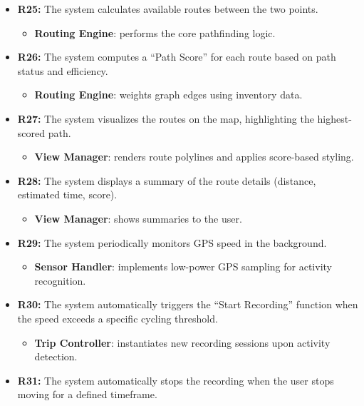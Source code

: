 \begin{itemize}
\begin{itemize}
          \end{itemize}
    \item \textbf{R25:} The system calculates available routes between the two points.
          \begin{itemize}
              \item \textbf{Routing Engine}: performs the core pathfinding logic.
          \end{itemize}
    \item \textbf{R26:} The system computes a “Path Score” for each route based on path status and efficiency.
          \begin{itemize}
              \item \textbf{Routing Engine}: weights graph edges using inventory data.
          \end{itemize}
    \item \textbf{R27:} The system visualizes the routes on the map, highlighting the highest-scored path.
          \begin{itemize}
              \item \textbf{View Manager}: renders route polylines and applies score-based styling.
          \end{itemize}
    \item \textbf{R28:} The system displays a summary of the route details (distance, estimated time, score).
          \begin{itemize}
              \item \textbf{View Manager}: shows summaries to the user.
          \end{itemize}
    \item \textbf{R29:} The system periodically monitors GPS speed in the background.
          \begin{itemize}
              \item \textbf{Sensor Handler}: implements low-power GPS sampling for activity recognition.
          \end{itemize}
    \item \textbf{R30:} The system automatically triggers the “Start Recording” function when the speed exceeds a specific cycling threshold.
          \begin{itemize}
              \item \textbf{Trip Controller}: instantiates new recording sessions upon activity detection.
          \end{itemize}
    \item \textbf{R31:} The system automatically stops the recording when the user stops moving for a defined timeframe.

\end{itemize}
